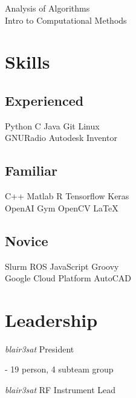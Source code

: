 \documentclass[]{deedy-resume-openfont}
\begin{document}
\begin{minipage}[t]{0.33\textwidth}
\vspace{0.125cm}

Analysis of Algorithms \\
Intro to Computational Methods \\


\sectionsep
\section{Skills}

\vspace{0.125cm}

\subsection{Experienced}
Python \textbullet{} C \textbullet{} Java \textbullet{} Git \textbullet{} Linux \\
GNURadio \textbullet{} Autodesk Inventor \\
\sectionsep

\subsection{Familiar}
C++ \textbullet{} Matlab \textbullet{} R \textbullet{} Tensorflow \textbullet{} Keras \\
OpenAI Gym \textbullet{} OpenCV \textbullet{} \LaTeX
\sectionsep

\subsection{Novice}
Slurm \textbullet{} ROS \textbullet{} JavaScript \textbullet{} Groovy \\
Google Cloud Platform \textbullet{} AutoCAD
\sectionsep

\sectionsep
\section{Leadership}

\vspace{0.125cm}

\textit{blair3sat} President

\indent - 19 person, 4 subteam group

\vspace{0.125cm}

\textit{blair3sat} RF Instrument Lead


\end{minipage}
\end{document}
